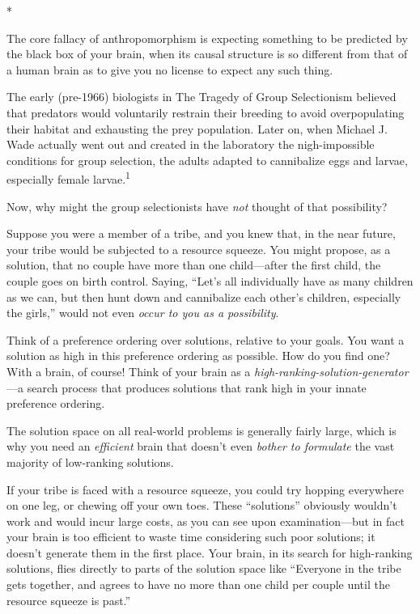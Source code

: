 {\centering
 *
\par}


{
 The core fallacy of anthropomorphism is expecting something to be
predicted by the black box of your brain, when its causal structure is
so different from that of a human brain as to give you no license to
expect any such thing. }

{
 The early (pre-1966) biologists in The Tragedy of Group
Selectionism believed that predators would voluntarily restrain their
breeding to avoid overpopulating their habitat and exhausting the prey
population. Later on, when Michael J. Wade actually went out and
created in the laboratory the nigh-impossible conditions for group
selection, the adults adapted to cannibalize eggs and larvae,
especially female larvae.\textsuperscript{1}}

{
 Now, why might the group selectionists have \textit{not} thought
of that possibility?}

{
 Suppose you were a member of a tribe, and you knew that, in the
near future, your tribe would be subjected to a resource squeeze. You
might propose, as a solution, that no couple have more than one
child---after the first child, the couple goes on birth control.
Saying, ``Let's all individually have
as many children as we can, but then hunt down and cannibalize each
other's children, especially the
girls,'' would not even \textit{occur to you as a
possibility}.}

{
 Think of a preference ordering over solutions, relative to your
goals. You want a solution as high in this preference ordering as
possible. How do you find one? With a brain, of course! Think of your
brain as a \textit{high-ranking-solution-generator}{}---a search
process that produces solutions that rank high in your innate
preference ordering.}

{
 The solution space on all real-world problems is generally fairly
large, which is why you need an \textit{efficient} brain that
doesn't even \textit{bother to formulate} the vast
majority of low-ranking solutions.}

{
 If your tribe is faced with a resource squeeze, you could try
hopping everywhere on one leg, or chewing off your own toes. These
``solutions'' obviously
wouldn't work and would incur large costs, as you can
see upon examination---but in fact your brain is too efficient to waste
time considering such poor solutions; it doesn't
generate them in the first place. Your brain, in its search for
high-ranking solutions, flies directly to parts of the solution space
like ``Everyone in the tribe gets together, and agrees
to have no more than one child per couple until the resource squeeze is
past.''}

